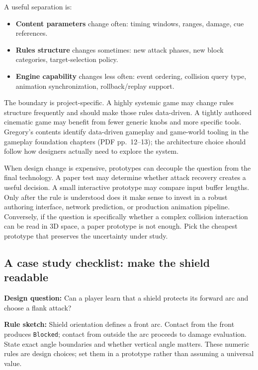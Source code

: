 A useful separation is:

\begin{itemize}
\tightlist
\item
  \textbf{Content parameters} change often: timing windows, ranges, damage, cue references.
\item
  \textbf{Rules structure} changes sometimes: new attack phases, new block categories, target-selection policy.
\item
  \textbf{Engine capability} changes less often: event ordering, collision query type, animation synchronization, rollback/replay support.
\end{itemize}

The boundary is project-specific. A highly systemic game may change rules structure frequently and should make those rules data-driven. A tightly authored cinematic game may benefit from fewer generic knobs and more specific tools. Gregory's contents identify data-driven gameplay and game-world tooling in the gameplay foundation chapters (PDF pp.~12--13); the architecture choice should follow how designers actually need to explore the system.

When design change is expensive, prototypes can decouple the question from the final technology. A paper test may determine whether attack recovery creates a useful decision. A small interactive prototype may compare input buffer lengths. Only after the rule is understood does it make sense to invest in a robust authoring interface, network prediction, or production animation pipeline. Conversely, if the question is specifically whether a complex collision interaction can be read in 3D space, a paper prototype is not enough. Pick the cheapest prototype that preserves the uncertainty under study.

\subsection{A case study checklist: make the shield readable}\label{06-engine-ii-ch041-a-case-study-checklist-make-the-shield-readable}

\textbf{Design question:} Can a player learn that a shield protects its forward arc and choose a flank attack?

\textbf{Rule sketch:} Shield orientation defines a front arc. Contact from the front produces \texttt{Blocked}; contact from outside the arc proceeds to damage evaluation. State exact angle boundaries and whether vertical angle matters. These numeric rules are design choices; set them in a prototype rather than assuming a universal value.

